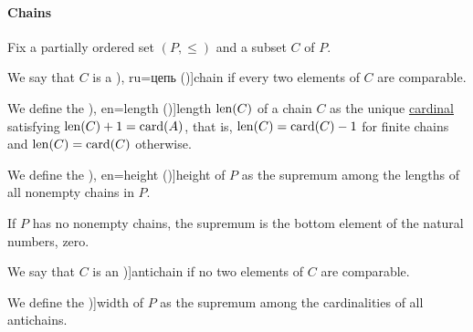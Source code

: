 \paragraph{Chains}

\begin{definition}\label{def:partial_order_chain}
  Fix a partially ordered set \( (P, \leq) \) and a subset \( C \) of \( P \).

  \begin{thmenum}
     We say that \( C \) is a \term[bg=верига (\cite[10]{Проданов1982ФункционаленАнализЧаст1}), ru=цепь (\cite[def. 3.4]{Гуров2013ТеорияРешёток})]{chain} if every two elements of \( C \) are comparable.

    \mimprovised We define the \term[ru=длина (\cite[83]{Гуров2013ТеорияРешёток}), en=length (\cite[4]{Grätzer2011LatticeTheory})]{length} \( \operatorname{len}(C) \) of a  chain \( C \) as the unique \hyperref[def:cardinal]{cardinal} satisfying \( {\operatorname{len}(C) + 1 = \operatorname{card}(A)} \), that is, \( \operatorname{len}(C) = \operatorname{card}(C) - 1 \) for finite chains and \( \operatorname{len}(C) = \operatorname{card}(C) \) otherwise.

    \mimprovised We define the \term[ru=высота (\cite[83]{Гуров2013ТеорияРешёток}), en=height (\cite[24]{Harzheim2005OrderedSets})]{height} of \( P \) as the supremum among the lengths of all nonempty chains in \( P \).

    If \( P \) has no nonempty chains, the supremum is the bottom element of the natural numbers, zero.

     We say that \( C \) is an \term[ru=антицепь (\cite[78]{Гуров2013ТеорияРешёток})]{antichain} if no two elements of \( C \) are comparable.

     We define the \term[ru=ширина (\cite[83]{Гуров2013ТеорияРешёток})]{width} of \( P \) as the supremum among the cardinalities of all antichains.
  \end{thmenum}
\end{definition}
